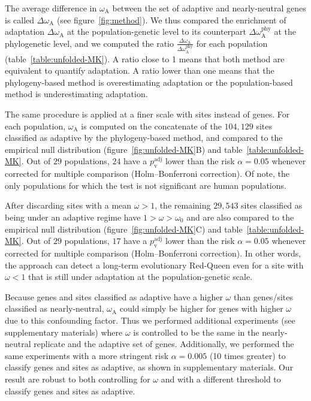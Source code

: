 \documentclass{article}
\begin{document}
    The average difference in $\omega_{\mathrm{A}}$ between the set of adaptive and nearly-neutral genes is called $\Delta \omega_{\mathrm{A}}$ (see figure~\ref{fig:method}).
    We thus compared the enrichment of adaptation $\Delta \omega_{\mathrm{A}}$ at the population-genetic level to its counterpart $\Delta\omega_{\mathrm{A}}^{\mathrm{phy}}$ at the phylogenetic level, and we computed the ratio $\frac{\Delta\omega_{\mathrm{A}}}{\Delta\omega_{\mathrm{A}}^{\mathrm{phy}}}$ for each population (table~\ref{table:unfolded-MK}).
    A ratio close to 1 means that both method are equivalent to quantify adaptation.
    A ratio lower than one means that the phylogeny-based method is overestimating adaptation or the population-based method is underestimating adaptation.

    The same procedure is applied at a finer scale with sites instead of genes.
    For each population, $\omega_{\mathrm{A}}$ is computed on the concatenate of the $104,129$ sites classified as adaptive by the phylogeny-based method, and compared to the empirical null distribution (figure~\ref{fig:unfolded-MK}B) and table~\ref{table:unfolded-MK}.
    Out of $29$ populations, $24$ have a $p_{\mathrm{v}}^{\mathrm{adj}}$ lower than the risk $\alpha=0.05$ whenever corrected for multiple comparison (Holm–Bonferroni correction).
    Of note, the only populations for which the test is not significant are human populations.

    After discarding sites with a mean $\omega > 1$, the remaining $29,543$ sites classified as being under an adaptive regime have $1 > \omega > \omega_{0}$ and are also compared to the empirical null distribution (figure~\ref{fig:unfolded-MK}C) and table~\ref{table:unfolded-MK}.
    Out of $29$ populations, $17$ have a $p_{\mathrm{v}}^{\mathrm{adj}}$ lower than the risk $\alpha=0.05$ whenever corrected for multiple comparison (Holm–Bonferroni correction).
    In other words, the approach can detect a long-term evolutionary Red-Queen even for a site with $\omega < 1$ that is still under adaptation at the population-genetic scale.

    Because genes and sites classified as adaptive have a higher $\omega$ than genes/sites classified as nearly-neutral, $\omega_{\mathrm{A}}$ could simply be higher for genes with higher $\omega$ due to this confounding factor.
    Thus we performed additional experiments (see supplementary materials) where $\omega$ is controlled to be the same in the nearly-neutral replicate and the adaptive set of genes.
    Additionally, we performed the same experiments with a more stringent risk $\alpha=0.005$ (10 times greater) to classify genes and sites as adaptive, as shown in supplementary materials.
    Our result are robust to both controlling for $\omega$ and with a different threshold to classify genes and sites as adaptive.
\end{document}
